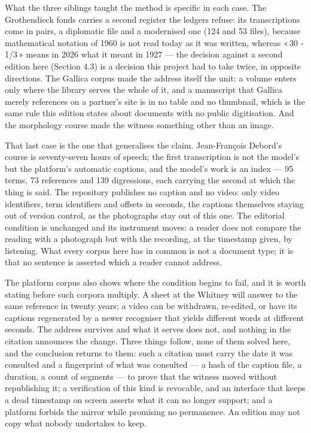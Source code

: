 \documentclass[11pt]{article}
\newcommand{\q}[1]{«\,#1\,»}
\begin{document}
What the three siblings taught the method is specific in each case. The
Grothendieck fonds carries a second register the ledgers refuse: its
transcriptions come in pairs, a diplomatic file and a modernised one (124 and 53
files), because mathematical notation of 1960 is not read today as it was
written, whereas \q{30 - 1/3} means in 2026 what it meant in 1927 — the decision
against a second edition here (Section 4.3) is a decision this project had to
take twice, in opposite directions. The Gallica corpus made the address itself
the unit: a volume enters only where the library serves the whole of it, and a
manuscript that Gallica merely references on a partner's site is in no table and
no thumbnail, which is the same rule this edition states about documents with no
public digitisation. And the morphology course made the witness something other
than an image.

That last case is the one that generalises the claim. Jean-François Debord's course is
seventy-seven hours of speech; the first transcription is not the model's but
the platform's automatic captions, and the model's work is an index — 95 terms,
73 references and 139 digressions, each carrying the second at which the thing
is said. The repository publishes no caption and no video: only video
identifiers, term identifiers and offsets in seconds, the captions themselves
staying out of version control, as the photographs stay out of this one. The
editorial condition is unchanged and its instrument moves: a reader does not
compare the reading with a photograph but with the recording, at the timestamp
given, by listening. What every corpus here has in common is not a document
type; it is that no sentence is asserted which a reader cannot address.

The platform corpus also shows where the condition begins to fail, and it is
worth stating before such corpora multiply. A sheet at the Whitney will answer
to the same reference in twenty years; a video can be withdrawn, re-edited, or
have its captions regenerated by a newer recogniser that yields different words
at different seconds. The address survives and what it serves does not, and
nothing in the citation announces the change. Three things follow, none of them
solved here, and the conclusion returns to them: such a citation must carry the
date it was consulted and a fingerprint of what was consulted — a hash of the
caption file, a duration, a count of segments — to prove that the witness moved
without republishing it; a verification of this kind is revocable, and an
interface that keeps a dead timestamp on screen asserts what it can no longer
support; and a platform forbids the mirror while promising no permanence. An
edition may not copy what nobody undertakes to keep.
\end{document}

